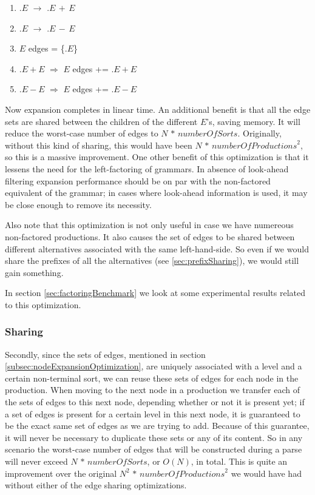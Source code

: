 \documentclass[a4paper,10pt]{article}
\begin{document}
\begin{enumerate}
 \setlength{\itemsep}{0pt}
 \setlength{\parskip}{0pt}
 \setlength{\parsep}{0pt}
 
 \item $.E$ $\rightarrow$ $.E\,+\,E$
 \item $.E$ $\rightarrow$ $.E\,-\,E$
 \item $E$ edges = \{$.E$\}
 \item $.E+E$ $\Rightarrow$ $E$ edges += $.E+E$
 \item $.E-E$ $\Rightarrow$ $E$ edges += $.E-E$
\end{enumerate}
Now expansion completes in linear time. An additional benefit is that all the edge sets are shared between the children of the different $E$'s, saving memory. It will reduce the worst-case number of edges to $N\,*\,\mathit{numberOfSorts}$. Originally, without this kind of sharing, this would have been $N\,*\,\mathit{numberOfProductions}^2$, so this is a massive improvement. One other benefit of this optimization is that it lessens the need for the left-factoring of grammars. In absence of look-ahead filtering expansion performance should be on par with the non-factored equivalent of the grammar; in cases where look-ahead information is used, it may be close enough to remove its necessity.

Also note that this optimization is not only useful in case we have numereous non-factored productions. It also causes the set of edges to be shared between different alternatives associated with the same left-hand-side. So even if we would share the prefixes of all the alternatives (see \ref{sec:prefixSharing}), we would still gain something.

In section \ref{sec:factoringBenchmark} we look at some experimental results related to this optimization.

\subsubsection{Sharing}
Secondly, since the sets of edges, mentioned in section \ref{subsec:nodeExpansionOptimization}, are uniquely associated with a level and a certain non-terminal sort, we can reuse these sets of edges for each node in the production. When moving to the next node in a production we transfer each of the sets of edges to this next node, depending whether or not it is present yet; if a set of edges is present for a certain level in this next node, it is guaranteed to be the exact same set of edges as we are trying to add. Because of this guarantee, it will never be necessary to duplicate these sets or any of its content. So in any scenario the worst-case number of edges that will be constructed during a parse will never exceed $N\,*\,\mathit{numberOfSorts}$, or $O(N)$, in total. This is quite an improvement over the original ${N}^2\,*\,\mathit{numberOfProductions}^2$ we would have had without either of the edge sharing optimizations.
\end{document}
